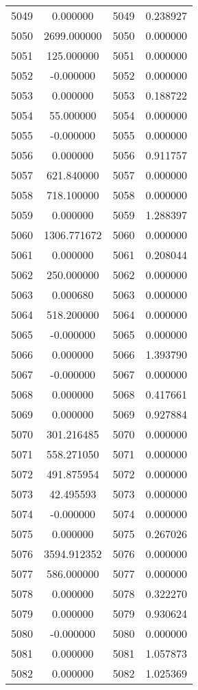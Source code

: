\documentclass[12pt]{article}
\begin{document}
\begin{longtable}{@{}cccc@{}}
5049 & 0.000000 & 5049 & 0.238927 \\
5050 & 2699.000000 & 5050 & 0.000000 \\
5051 & 125.000000 & 5051 & 0.000000 \\
5052 & -0.000000 & 5052 & 0.000000 \\
5053 & 0.000000 & 5053 & 0.188722 \\
5054 & 55.000000 & 5054 & 0.000000 \\
5055 & -0.000000 & 5055 & 0.000000 \\
5056 & 0.000000 & 5056 & 0.911757 \\
5057 & 621.840000 & 5057 & 0.000000 \\
5058 & 718.100000 & 5058 & 0.000000 \\
5059 & 0.000000 & 5059 & 1.288397 \\
5060 & 1306.771672 & 5060 & 0.000000 \\
5061 & 0.000000 & 5061 & 0.208044 \\
5062 & 250.000000 & 5062 & 0.000000 \\
5063 & 0.000680 & 5063 & 0.000000 \\
5064 & 518.200000 & 5064 & 0.000000 \\
5065 & -0.000000 & 5065 & 0.000000 \\
5066 & 0.000000 & 5066 & 1.393790 \\
5067 & -0.000000 & 5067 & 0.000000 \\
5068 & 0.000000 & 5068 & 0.417661 \\
5069 & 0.000000 & 5069 & 0.927884 \\
5070 & 301.216485 & 5070 & 0.000000 \\
5071 & 558.271050 & 5071 & 0.000000 \\
5072 & 491.875954 & 5072 & 0.000000 \\
5073 & 42.495593 & 5073 & 0.000000 \\
5074 & -0.000000 & 5074 & 0.000000 \\
5075 & 0.000000 & 5075 & 0.267026 \\
5076 & 3594.912352 & 5076 & 0.000000 \\
5077 & 586.000000 & 5077 & 0.000000 \\
5078 & 0.000000 & 5078 & 0.322270 \\
5079 & 0.000000 & 5079 & 0.930624 \\
5080 & -0.000000 & 5080 & 0.000000 \\
5081 & 0.000000 & 5081 & 1.057873 \\
5082 & 0.000000 & 5082 & 1.025369 \\

\end{longtable}
\end{document}
